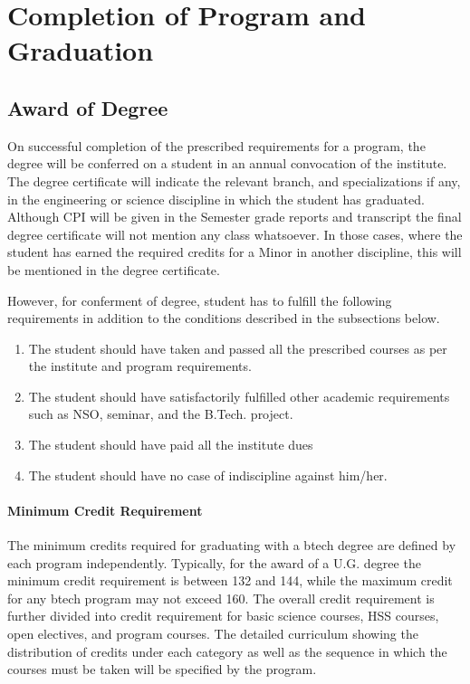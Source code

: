 \section{Completion of Program and Graduation}

\subsection{Award of Degree \label{lab:Award of Degree}}

On successful completion of the prescribed requirements for a program, the degree will be conferred on a \gls{student} in an annual convocation of the \gls{institute}. The degree certificate will indicate the relevant branch, and specializations if any, in the engineering or science discipline in which the \gls{student} has graduated. Although CPI will be given in the Semester grade reports and transcript the final degree certificate will not mention any class whatsoever. In those cases, where the \gls{student} has earned the required credits for a Minor in another discipline, this will be mentioned in the degree certificate.

However, for conferment of degree, \gls{student} has to fulfill the following requirements in addition to the conditions described in the subsections below. 

\begin{enumerate}[leftmargin=15mm]
    \item The \gls{student} should have taken and passed all the prescribed courses as per the \gls{institute} and program requirements. 
    \item The \gls{student} should have satisfactorily fulfilled other academic requirements such as NSO, seminar, and the B.Tech. project. 
    \item The \gls{student} should have paid all the \gls{institute} dues 
    \item The \gls{student} should have no case of indiscipline against him/her.
\end{enumerate}

\paragraph{Minimum Credit Requirement} The minimum credits required for graduating with a \acrshort{btech} degree are defined by each \gls{program} independently. Typically, for the award of a U.G. degree the minimum credit requirement is between 132 and 144, while the maximum credit for any \acrshort{btech} program may not exceed 160. The overall credit requirement is further divided into credit requirement for basic science courses, HSS courses, open electives, and program courses. The detailed curriculum showing the distribution of credits under each category as well as the sequence in which the courses must be taken will be specified by the \gls{program}.

